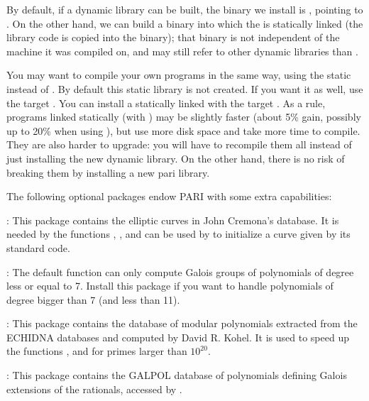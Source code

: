 By default, if a dynamic library  can be built, the 
binary we install is , pointing to . On the other
hand, we can build a  binary into which the  is
statically linked (the library code is copied into the binary); that binary
is not independent of the machine it was compiled on, and may still refer to
other dynamic libraries than .

You may want to compile your own programs in the same way, using the static
 instead of . By default this static library
 is not created. If you want it as well, use the target
. You can install a statically linked  with
the target . As a rule, programs linked statically
(with ) may be slightly faster (about 5\% gain, possibly
up to 20\% when using ), but use more disk space and take more
time to compile. They are also harder to upgrade: you will have to recompile
them all instead of just installing the new dynamic library. On the other
hand, there is no risk of breaking them by installing a new pari library.

 The following optional packages endow PARI with some
extra capabilities:

\item {}: This package contains the elliptic curves in
John Cremona's database. It is needed by the functions ,
,  and can be used by  to initialize a curve given by its standard code.

\item {}: The default  function can only
compute Galois groups of polynomials of degree less or equal to 7. Install
this package if you want to handle polynomials of degree bigger than 7 (and
less than 11).

\item {}: This package contains the database of modular
polynomials extracted from the ECHIDNA databases and computed by David R.
Kohel. It is used to speed up the functions ,  and
 for primes larger than $10^{20}$.

\item {}: This package contains the GALPOL database of polynomials
defining Galois extensions of the rationals, accessed by .

